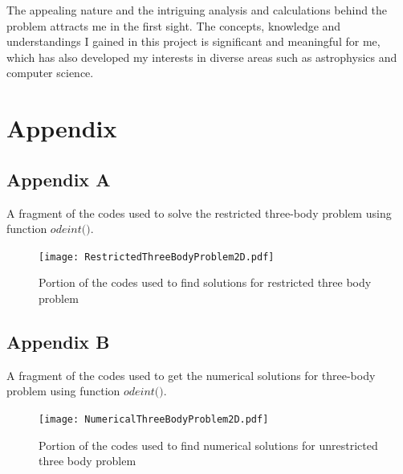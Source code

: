 The appealing nature and the intriguing analysis and calculations behind the problem attracts me in the first sight. The concepts, knowledge and understandings I gained in this project is significant and meaningful for me, which has also developed my interests in diverse areas such as astrophysics and computer science. 


\section{Appendix}

\subsection{Appendix A}
\label{Appendix A}

A fragment of the codes used to solve the restricted three-body problem using function $\textit{odeint()}$.

\begin{figure}[!htb]
    \centering
    \texttt{[image: RestrictedThreeBodyProblem2D.pdf]}
    \caption{Portion of the codes used to find solutions for restricted three body problem}
\end{figure}

\subsection{Appendix B}
\label{Appendix B}

A fragment of the codes used to get the numerical solutions for three-body problem using function $\textit{odeint()}$.

\begin{figure}[!htb]
    \centering
    \texttt{[image: NumericalThreeBodyProblem2D.pdf]}
    \caption{Portion of the codes used to find numerical solutions for unrestricted three body problem}
\end{figure}










\newpage


